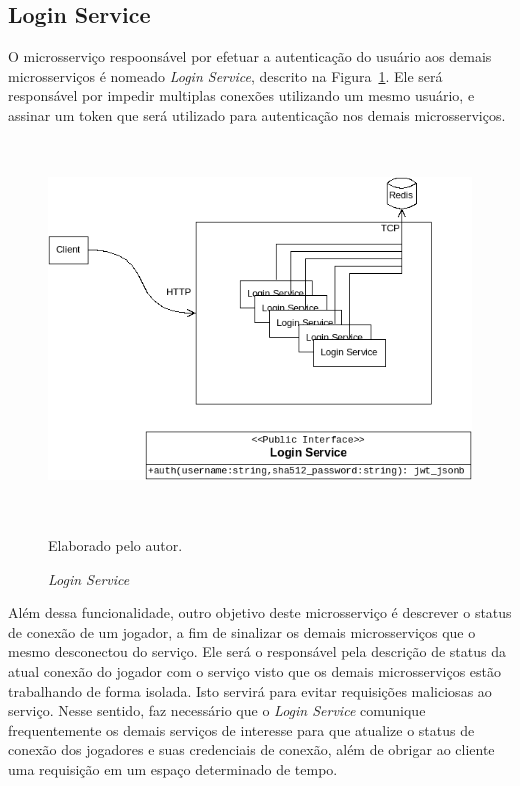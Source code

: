 \subsection{Login Service}



O microsserviço respoonsável por efetuar a autenticação do usuário aos demais microsserviços é nomeado \textit{Login Service}, descrito na Figura~\ref{fig:login_service}.
%
Ele será responsável por impedir multiplas conexões utilizando um mesmo usuário, e assinar um token que será utilizado para autenticação nos demais microsserviços.



\begin{figure}[htb!]
\caption{\textit{Login Service}}
\label{fig:login_service}
\includegraphics[height=10cm]{img/cap3/login_service.png}
\centering

Elaborado pelo autor.
\end{figure}



Além dessa funcionalidade, outro objetivo deste microsserviço é descrever o status de conexão de um jogador, a fim de sinalizar os demais microsserviços que o mesmo desconectou do serviço.
%
Ele será o responsável pela descrição de status da atual conexão do jogador com o serviço visto que os demais microsserviços estão trabalhando de forma isolada.
%
Isto servirá para evitar requisições maliciosas ao serviço.
%
Nesse sentido, faz necessário que o \textit{Login Service} comunique frequentemente os demais serviços de interesse para que atualize o status de conexão dos jogadores e suas credenciais de conexão, além de obrigar ao cliente uma requisição em um espaço determinado de tempo.



